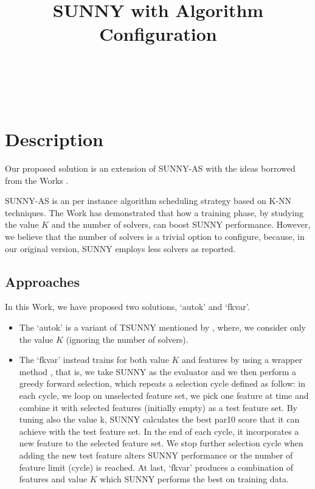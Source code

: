 \documentclass[tablecaption=bottom,wcp]{jmlr} %
\title[SUNNY-OASC]{SUNNY with Algorithm Configuration}
\author{\Name{Tong Liu} \Email{t.liu@unibo.it}\\
   \Name{Roberto Amadini} \Email{roberto.amadini@unimelb.edu.au}\\
   \Name{Jacopo Mauro} \Email{mauro.jacopo@gmail.com}\\
    }
\begin{document}
\maketitle



\section{Description}


Our proposed solution is an extension of SUNNY-AS \cite{DBLP:conf/cilc/AmadiniBGLM15,sunnyas} with the ideas borrowed from the Works \cite{DBLP:conf/lion/LindauerBH16,Kohavi97wrappersfor}.

SUNNY-AS is an per instance algorithm scheduling strategy based on K-NN techniques. The Work \cite{DBLP:conf/lion/LindauerBH16} has demonstrated that how a training phase, by studying the value $K$ and the number of solvers, can boost SUNNY performance. However, we believe that the number of solvers is a trivial option to configure, because, in our original version, SUNNY employs less solvers as reported. 

\subsection{Approaches}

In this Work, we have proposed two solutions, `autok' and `fkvar'. 

\begin{itemize}
  \item The `autok' is a variant of TSUNNY mentioned by \cite{DBLP:conf/lion/LindauerBH16}, where, we consider only the value $K$ (ignoring the number of solvers). 
  \item The `fkvar' instead trains for both value $K$ and features by using a wrapper method \cite{Kohavi97wrappersfor}, that is, we take SUNNY as the evaluator and we then perform a greedy forward selection, which repeats a selection cycle defined as follow: in each cycle, we loop on unselected feature set, we pick one feature at time and combine it with selected features (initially empty) as a test feature set. By tuning also the value k, SUNNY calculates the best par10 score that it can achieve with the test feature set. In the end of each cycle, it incorporates a new feature to the selected feature set. We stop further selection cycle when adding the new test feature alters SUNNY performance or the number of feature limit (cycle) is reached. At last, `fkvar' produces a combination of features and value $K$ which SUNNY performs the best on training data.
\end{itemize}
 
\end{document}
